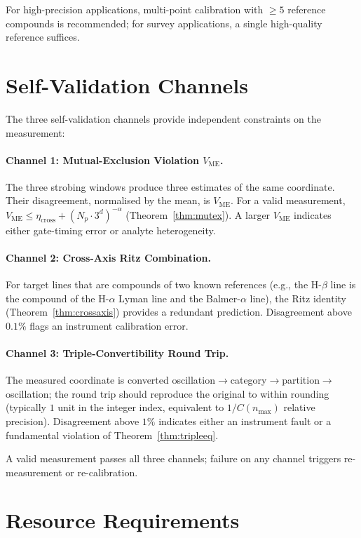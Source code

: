 \documentclass[11pt,a4paper]{article}
\theoremstyle{thmstyle}
\theoremstyle{axiomstyle}
\theoremstyle{definition}
\theoremstyle{remark}
\newcommand{\Vme}{V_{\mathrm{ME}}}
\begin{document}
For high-precision applications, multi-point calibration with $\geq 5$ reference compounds is recommended; for survey applications, a single high-quality reference suffices.

\section{Self-Validation Channels}
\label{sec:methods_selfvalid}

The three self-validation channels provide independent constraints on the measurement:

\paragraph{Channel 1: Mutual-Exclusion Violation $\Vme$.} The three strobing windows produce three estimates of the same coordinate. Their disagreement, normalised by the mean, is $\Vme$. For a valid measurement, $\Vme\leq\eta_{\mathrm{cross}}+(N_{p}\cdot 3^{d})^{-\alpha}$ (Theorem~\ref{thm:mutex}). A larger $\Vme$ indicates either gate-timing error or analyte heterogeneity.

\paragraph{Channel 2: Cross-Axis Ritz Combination.} For target lines that are compounds of two known references (e.g., the H-$\beta$ line is the compound of the H-$\alpha$ Lyman line and the Balmer-$\alpha$ line), the Ritz identity (Theorem~\ref{thm:crossaxis}) provides a redundant prediction. Disagreement above $0.1\%$ flags an instrument calibration error.

\paragraph{Channel 3: Triple-Convertibility Round Trip.} The measured coordinate is converted oscillation$\to$category$\to$partition$\to$oscillation; the round trip should reproduce the original to within rounding (typically $1$ unit in the integer index, equivalent to $1/C(n_{\mathrm{max}})$ relative precision). Disagreement above $1\%$ indicates either an instrument fault or a fundamental violation of Theorem~\ref{thm:tripleeq}.

A valid measurement passes all three channels; failure on any channel triggers re-measurement or re-calibration.

\section{Resource Requirements}
\label{sec:methods_resources}
\end{document}
